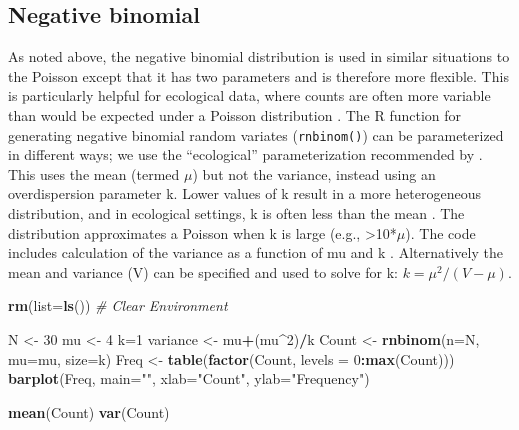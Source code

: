 \documentclass[
]{krantz}
\makeatletter
\newenvironment{Shaded}{\begin{snugshade}}{\end{snugshade}}
\newcommand{\AttributeTok}[1]{\textcolor[rgb]{0.27,0.27,0.27}{#1}}
\newcommand{\CommentTok}[1]{\textcolor[rgb]{0.37,0.37,0.37}{\textit{#1}}}
\newcommand{\DecValTok}[1]{\textcolor[rgb]{0.06,0.06,0.06}{#1}}
\newcommand{\FunctionTok}[1]{\textcolor[rgb]{0.27,0.27,0.27}{\textbf{#1}}}
\newcommand{\NormalTok}[1]{#1}
\newcommand{\OtherTok}[1]{\textcolor[rgb]{0.37,0.37,0.37}{#1}}
\newcommand{\SpecialCharTok}[1]{\textcolor[rgb]{0.43,0.43,0.43}{\textbf{#1}}}
\newcommand{\StringTok}[1]{\textcolor[rgb]{0.5,0.5,0.5}{#1}}
\newenvironment{kframe}{%
\medskip{}
\setlength{\fboxsep}{.8em}
 \def\at@end@of@kframe{}%
 \ifinner\ifhmode%
  \def\at@end@of@kframe{\end{minipage}}%
  \begin{minipage}{\columnwidth}%
 \fi\fi%
 \def\FrameCommand##1{\hskip\@totalleftmargin \hskip-\fboxsep
 \colorbox{shadecolor}{##1}\hskip-\fboxsep
     \hskip-\linewidth \hskip-\@totalleftmargin \hskip\columnwidth}%
 \MakeFramed {\advance\hsize-\width
   \@totalleftmargin\z@ \linewidth\hsize
   \@setminipage}}%
 {\par\unskip\endMakeFramed%
 \at@end@of@kframe}
\renewenvironment{Shaded}{\begin{kframe}}{\end{kframe}}
\makeatother
\begin{document}
\hypertarget{NegBinom}{%
\subsection{Negative binomial}\label{NegBinom}}

As noted above, the negative binomial distribution is used in similar situations to the Poisson except that it has two parameters and is therefore more flexible. This is particularly helpful for ecological data, where counts are often more variable than would be expected under a Poisson distribution \citep{bolker2008, link.barker_2009}. The R function for generating negative binomial random variates (\texttt{rnbinom()}) can be parameterized in different ways; we use the ``ecological'' parameterization recommended by \citet{bolker2008}. This uses the mean (termed \(\mu\)) but not the variance, instead using an overdispersion parameter k. Lower values of k result in a more heterogeneous distribution, and in ecological settings, k is often less than the mean \citep{bolker2008}. The distribution approximates a Poisson when k is large (e.g., \textgreater10*\(\mu\)). The code includes calculation of the variance as a function of mu and k \citep{bolker2008}. Alternatively the mean and variance (V) can be specified and used to solve for k: \(k = \mu^2/(V-\mu)\).

\begin{Shaded}
\begin{Highlighting}[]
\FunctionTok{rm}\NormalTok{(}\AttributeTok{list=}\FunctionTok{ls}\NormalTok{()) }\CommentTok{\# Clear Environment}

\NormalTok{N }\OtherTok{\textless{}{-}} \DecValTok{30}
\NormalTok{mu }\OtherTok{\textless{}{-}} \DecValTok{4}
\NormalTok{k}\OtherTok{=}\DecValTok{1}
\NormalTok{variance }\OtherTok{\textless{}{-}}\NormalTok{ mu}\SpecialCharTok{+}\NormalTok{(mu}\SpecialCharTok{\^{}}\DecValTok{2}\NormalTok{)}\SpecialCharTok{/}\NormalTok{k}
\NormalTok{Count }\OtherTok{\textless{}{-}} \FunctionTok{rnbinom}\NormalTok{(}\AttributeTok{n=}\NormalTok{N, }\AttributeTok{mu=}\NormalTok{mu, }\AttributeTok{size=}\NormalTok{k)}
\NormalTok{Freq }\OtherTok{\textless{}{-}} \FunctionTok{table}\NormalTok{(}\FunctionTok{factor}\NormalTok{(Count, }\AttributeTok{levels =} \DecValTok{0}\SpecialCharTok{:}\FunctionTok{max}\NormalTok{(Count)))}
\FunctionTok{barplot}\NormalTok{(Freq, }\AttributeTok{main=}\StringTok{""}\NormalTok{, }\AttributeTok{xlab=}\StringTok{"Count"}\NormalTok{, }\AttributeTok{ylab=}\StringTok{"Frequency"}\NormalTok{)}

\FunctionTok{mean}\NormalTok{(Count)}
\FunctionTok{var}\NormalTok{(Count)}
\end{Highlighting}
\end{Shaded}
\end{document}
